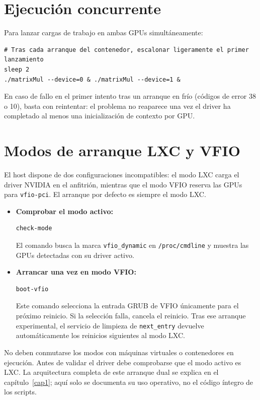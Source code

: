 \section{Ejecución concurrente}

Para lanzar cargas de trabajo en ambas GPUs simultáneamente:

\begin{Verbatim}
# Tras cada arranque del contenedor, escalonar ligeramente el primer lanzamiento
sleep 2
./matrixMul --device=0 & ./matrixMul --device=1 &
\end{Verbatim}

En caso de fallo en el primer intento tras un arranque en frío (códigos de error 38 o 10), basta con reintentar: el problema no reaparece una vez el driver ha completado al menos una inicialización de contexto por GPU.

\section{Modos de arranque LXC y VFIO}

El host dispone de dos configuraciones incompatibles: el modo LXC carga el driver NVIDIA en el anfitrión, mientras que el modo VFIO reserva las GPUs para \texttt{vfio-pci}. El arranque por defecto es siempre el modo LXC.

\begin{itemize}
    \item \textbf{Comprobar el modo activo:}
\begin{Verbatim}
check-mode
\end{Verbatim}
    El comando busca la marca \texttt{vfio\_dynamic} en \texttt{/proc/cmdline} y muestra las GPUs detectadas con su driver activo.

    \item \textbf{Arrancar una vez en modo VFIO:}
\begin{Verbatim}
boot-vfio
\end{Verbatim}
    Este comando selecciona la entrada GRUB de VFIO únicamente para el próximo reinicio. Si la selección falla, cancela el reinicio. Tras ese arranque experimental, el servicio de limpieza de \texttt{next\_entry} devuelve automáticamente los reinicios siguientes al modo LXC.
\end{itemize}

No deben conmutarse los modos con máquinas virtuales o contenedores en ejecución. Antes de validar el driver debe comprobarse que el modo activo es LXC. La arquitectura completa de este arranque dual se explica en el capítulo~\ref{cap1}; aquí solo se documenta su uso operativo, no el código íntegro de los scripts.

